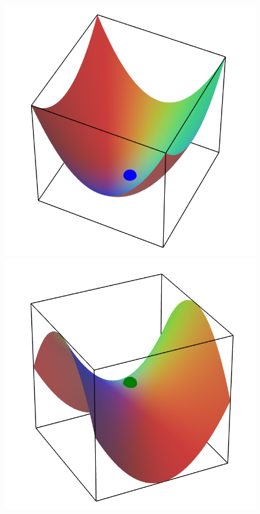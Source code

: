 \begin{figure}[h!]
\begin{minipage}{0.3\textwidth}
\includegraphics[scale=0.2]{images/math/multivar/localmin.png}
\end{minipage}
\begin{minipage}{0.3\textwidth}
\centering
\includegraphics[scale=0.2]{images/math/multivar/saddlepoint2.png}
\end{minipage}
\end{figure}

